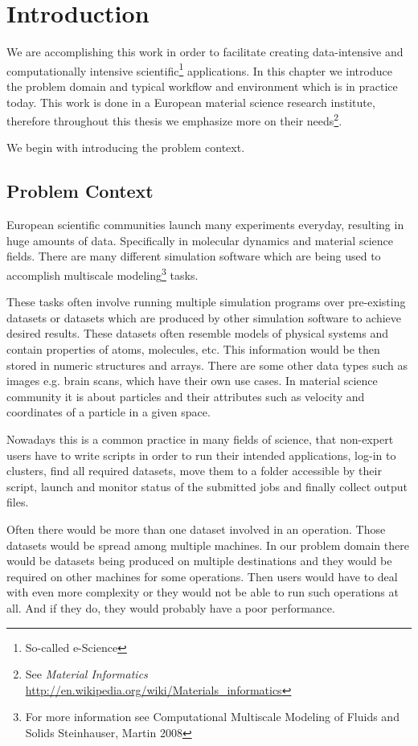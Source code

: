 \chapter{Introduction}
\label{cha:introduction}

We are accomplishing this work in order to facilitate creating data-intensive and computationally intensive 
scientific\footnote{So-called e-Science} applications. 
In this chapter we introduce the problem domain and typical workflow and environment which is in practice today.
This work is done in a European material science research institute, 
therefore throughout this thesis we emphasize more on their 
needs\footnote{See \textit{Material Informatics} \url{http://en.wikipedia.org/wiki/Materials_informatics}}. 

We begin with introducing the problem context.

\section{Problem Context}
European scientific communities launch many experiments everyday, resulting in huge amounts
of data. Specifically in molecular dynamics and material science fields. 
There are many different simulation software which are being used to accomplish multiscale 
modeling\footnote{For more information see Computational Multiscale Modeling of Fluids and Solids Steinhauser, Martin 2008}
tasks.

These tasks often involve running multiple simulation programs over pre-existing datasets 
or datasets which are produced by other simulation software to achieve desired results. 
These datasets often resemble models of physical systems and contain properties of atoms, molecules, etc.
This information would be then stored in numeric structures and arrays.
There are some other data types such as images e.g. brain scans, which have their own use cases.
In material science community it is about particles and their attributes such as velocity and coordinates of a particle in a given space.

Nowadays this is a common practice in many fields of science, 
that non-expert users have to write scripts in order to run their intended applications,
log-in to clusters, find all required datasets, move them to a folder
accessible by their script, launch and monitor status of the submitted jobs
and finally collect output files.

Often there would be more than one dataset involved in an operation. 
Those datasets would be spread among multiple machines. 
In our problem domain there would be datasets being produced on multiple destinations and
they would be required on other machines for some operations.
Then users would have to deal with even more complexity or they would not be able to run
such operations at all. And if they do, they would probably have a poor performance.

